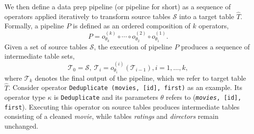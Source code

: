 We then define a data prep pipeline (or pipeline for short) as a sequence of operators applied iteratively to transform source tables $\mathcal{S}$ into a target table $\hat{T}$. Formally, a pipeline $P$ is defined as an ordered composition of $k$ operators, \ie
%
\begin{equation} \nonumber
    P = o^{(k)}_{\theta_k} \circ \cdots \circ o^{(2)}_{\theta_2} \circ o^{(1)}_{\theta_1}.
\end{equation}
%
Given a set of source tables $\mathcal{S}$, the execution of pipeline $P$ produces a sequence of intermediate table sets, \ie 
%
\begin{equation} \nonumber
    \mathcal{T}_{0} = \mathcal{S}, ~\mathcal{T}_i =  o^{(i)}_{\theta_i}(\mathcal{T}_{i-1}), i=1,\ldots,k, 
\end{equation}
%
where $\mathcal{T}_k$ denotes the final output of the pipeline, which we refer to target table $\hat{T}$.
%
Consider operator \texttt{Deduplicate (movies, [id], first)} as an example. 
Its operator type $\kappa$ is \texttt{Deduplicate} and its parameters $\theta$ refers to (\texttt{\textit{movies}, [id], first}). Executing this operator on source tables produces intermediate tables consisting of a cleaned \textit{movie}, while tables \textit{ratings} and \textit{directors} remain unchanged.

